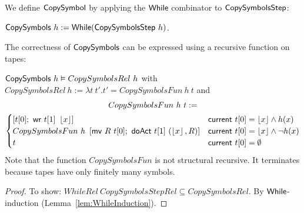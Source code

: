 We define $\mathsf{CopySymbol}$ by applying the $\mathsf{While}$ combinator to $\mathsf{CopySymbolsStep}$:
\begin{definition}[$\MS{CopySymbols}$][CopySymbols]
  \label{def:CopySymbols}
  $\mathsf{CopySymbols}~h := \mathsf{While}(\mathsf{CopySymbolsStep}~h)$.
\end{definition}

The correctness of $\MS{CopySymbols}$ can be expressed using a recursive function on tapes:
\begin{lemma}
  \label{lem:CopySymbols_Realise}
  $\mathsf{CopySymbols}~h \mathrel{\vDash} CopySymbolsRel~h$
  with $CopySymbolsRel~h := \lambda t~t'. t' = CopySymbolsFun~h~t$ and
  {
    \small
    \begin{multline*}
      CopySymbolsFun~h~t :=\\
      \begin{cases}
        \left[ t[0];~ \mathsf{wr}~t[1]~\left\lfloor {x} \right\rfloor \right]                                    & \mathsf{current}~t[0]=\left\lfloor {x} \right\rfloor \land h(x) \\
        CopySymbolsFun~h~\left[ \mathsf{mv}~R~t[0];~ \mathsf{doAct}~t[1]~(\left\lfloor {x} \right\rfloor, R) \right] & \mathsf{current}~t[0]=\left\lfloor {x} \right\rfloor \land \lnot h(x) \\
        t                                                                        & \mathsf{current}~t[0]=\emptyset
      \end{cases}
    \end{multline*}
  }
  Note that the function $CopySymbolsFun$ is not structural recursive.  It terminates because tapes have only finitely many symbols.
\end{lemma}
\begin{proof}
  To show: $WhileRel~CopySymbolsStepRel \subseteq CopySymbolsRel$.  By $\mathsf{While}$-induction (Lemma~\ref{lem:WhileInduction}).
\end{proof}

